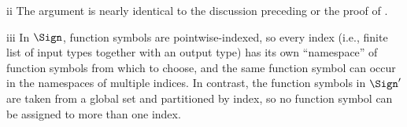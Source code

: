 \begin{partsolution}{ii}
The argument is nearly identical to the discussion preceding \cite[Proposition~1.2.2]{MR1674451} or the proof of .
\end{partsolution}

\begin{partsolution}{iii}
In \(\Sign\), function symbols are pointwise-indexed, so every index (i.e., finite list of input types together with an output type) has its own ``namespace'' of function symbols from which to choose, and the same function symbol can occur in the namespaces of multiple indices. In contrast, the function symbols in \(\Sign^\prime\) are taken from a global set and partitioned by index, so no function symbol can be assigned to more than one index.
\end{partsolution}